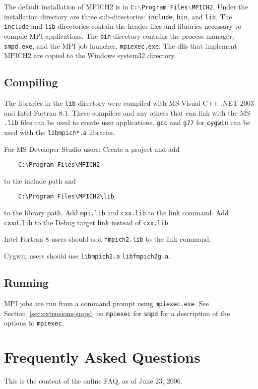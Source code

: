 \documentclass[dvipdfm,11pt]{article}
\begin{document}
The default installation of MPICH2 is in
\texttt{C:$\backslash$Program Files$\backslash$MPICH2}. Under the installation
directory are three sub-directories: \texttt{include}, \texttt{bin}, and
\texttt{lib}.  The \texttt{include} and \texttt{lib} directories contain
the header files and libraries necessary to compile MPI applications.  
The \texttt{bin} directory contains the process manager, \texttt{smpd.exe},
and the MPI job launcher, \texttt{mpiexec.exe}.  The dlls that implement
MPICH2 are copied to the Windows system32 directory.

\subsection{Compiling}
\label{sec:wincompile}

The libraries in the \texttt{lib} directory were compiled with MS Visual C++ .NET 2003
and Intel Fortran 8.1.  These 
compilers and any others that can link with the MS \texttt{.lib} files can be used to
create user applications.  \texttt{gcc} and \texttt{g77} for \texttt{cygwin} can be used with the 
\texttt{libmpich*.a} libraries.

For MS Developer Studio users: Create a project and add
\begin{verbatim}
    C:\Program Files\MPICH2
\end{verbatim}
to the include path and
\begin{verbatim}
    C:\Program Files\MPICH2\lib
\end{verbatim}
to
the library path.  Add \texttt{mpi.lib} and \texttt{cxx.lib} to the
link command.  Add \texttt{cxxd.lib} to the Debug target link instead of
\texttt{cxx.lib}.

Intel Fortran 8 users should add \texttt{fmpich2.lib} to the link command. 

Cygwin users should use \texttt{libmpich2.a} \texttt{libfmpich2g.a}.

\subsection{Running}
\label{sec:winrun}

MPI jobs are run from a command prompt using \texttt{mpiexec.exe}.  See
Section~\ref{sec:extensions-smpd} on \texttt{mpiexec} for \texttt{smpd}
for a description of the options to \texttt{mpiexec}.

\clearpage
\appendix

\section{Frequently Asked Questions}
This is the content of the online FAQ, as of June 23, 2006.





\end{document}
